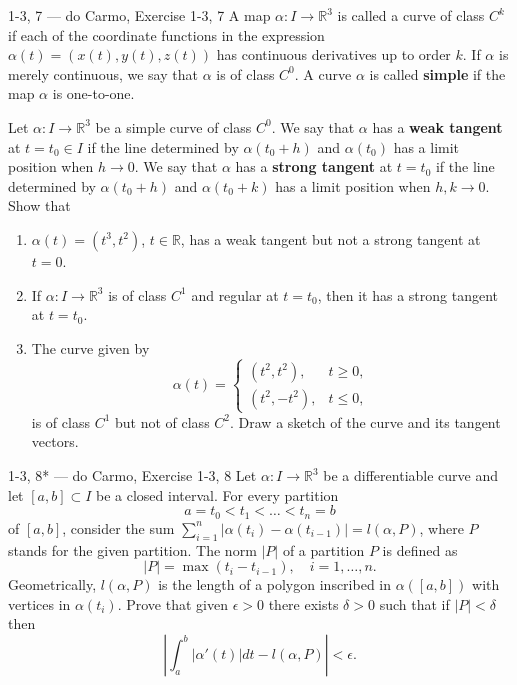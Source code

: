 \begin{exercise}{1-3, 7 — do Carmo, Exercise 1-3, 7}
A map $\alpha: I \to \mathbb{R}^3$ is called a curve of class $C^k$ if each of the coordinate functions in the expression $\alpha(t) = (x(t), y(t), z(t))$ has continuous derivatives up to order $k$. If $\alpha$ is merely continuous, we say that $\alpha$ is of class $C^0$. A curve $\alpha$ is called \textbf{simple} if the map $\alpha$ is one-to-one.

Let $\alpha: I \to \mathbb{R}^3$ be a simple curve of class $C^0$. We say that $\alpha$ has a \textbf{weak tangent} at $t = t_0 \in I$ if the line determined by $\alpha(t_0 + h)$ and $\alpha(t_0)$ has a limit position when $h \to 0$. We say that $\alpha$ has a \textbf{strong tangent} at $t = t_0$ if the line determined by $\alpha(t_0 + h)$ and $\alpha(t_0 + k)$ has a limit position when $h, k \to 0$. Show that
\begin{enumerate}
\item[a.] $\alpha(t) = (t^3, t^2)$, $t \in \mathbb{R}$, has a weak tangent but not a strong tangent at $t = 0$.
\item[b.] If $\alpha: I \to \mathbb{R}^3$ is of class $C^1$ and regular at $t = t_0$, then it has a strong tangent at $t = t_0$.
\item[c.] The curve given by
\[
\alpha(t) = \begin{cases} (t^2, t^2), & t \geq 0, \\ (t^2, -t^2), & t \leq 0, \end{cases}
\]
is of class $C^1$ but not of class $C^2$. Draw a sketch of the curve and its tangent vectors.
\end{enumerate}
\end{exercise}

\begin{exercise}{1-3, 8* — do Carmo, Exercise 1-3, 8}
Let $\alpha: I \to \mathbb{R}^3$ be a differentiable curve and let $[a, b] \subset I$ be a closed interval. For every partition
\[
a = t_0 < t_1 < \dots < t_n = b
\]
of $[a, b]$, consider the sum $\sum_{i=1}^n |\alpha(t_i) - \alpha(t_{i-1})| = l(\alpha, P)$, where $P$ stands for the given partition. The norm $|P|$ of a partition $P$ is defined as
\[
|P| = \max(t_i - t_{i-1}), \quad i = 1, \dots, n.
\]
Geometrically, $l(\alpha, P)$ is the length of a polygon inscribed in $\alpha([a, b])$ with vertices in $\alpha(t_i)$. Prove that given $\epsilon > 0$ there exists $\delta > 0$ such that if $|P| < \delta$ then
\[
\left| \int_a^b |\alpha'(t)| dt - l(\alpha, P) \right| < \epsilon.
\]
\end{exercise}

